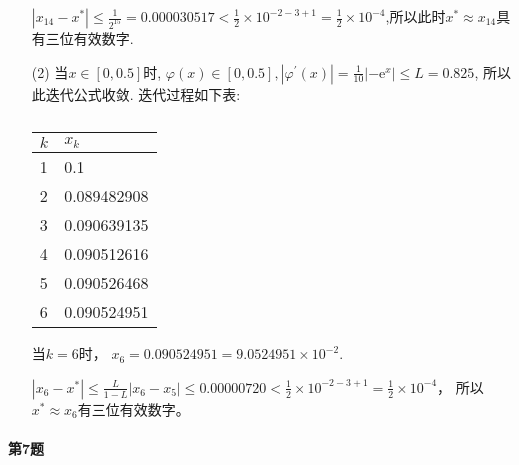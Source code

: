 \documentclass[a4paper]{article}
\begin{document}
\begin{enumerate}
        $\left|x_{14}-x^{*}\right| \leqslant \frac{1}{2^{15}}=0.000030517<\frac{1}{2} \times 10^{-2-3+1} = \frac{1}{2} \times 10^{-4}$,所以此时$x^{*} \approx x_{14}$具有三位有效数字.
    \item [(2)]
    当$x\in [0, 0.5]$时, $\varphi(x) \in[0,0.5],\left|\varphi^{\prime}(x)\right|=\frac{1}{10}\left|-\mathrm{e}^{x}\right| \leqslant L = 0.825$,
    所以此迭代公式收敛.
    迭代过程如下表: \par
    \begin{table}[h]
        \centering
        \caption{}
        \label{tab:my-table}
        \begin{tabular}{ll}
        \hline
        $k$ & $x_k$ \\ \hline
        1 & 0.1 \\
        2 & 0.089482908 \\
        3 & 0.090639135 \\
        4 & 0.090512616 \\
        5 & 0.090526468 \\
        6 & 0.090524951 \\
        \hline 
        \end{tabular}
        \end{table} \par
    当$k = 6$时， $x_6 = 0.090524951=9.0524951 \times 10 ^{-2}$.\par
    $\left|x_{6}-x^{*}\right| \leqslant \frac{L}{1-L}\left|x_{6}-x_{5}\right| \leqslant 0.00000720<\frac{1}{2} \times 10^{-2 -3 +1} = \frac{1}{2} \times 10^{-4}$， 所以$x^{*} \approx x_6$有三位有效数字。
\end{enumerate}
\paragraph{第7题}~{}
\\
\end{document}
